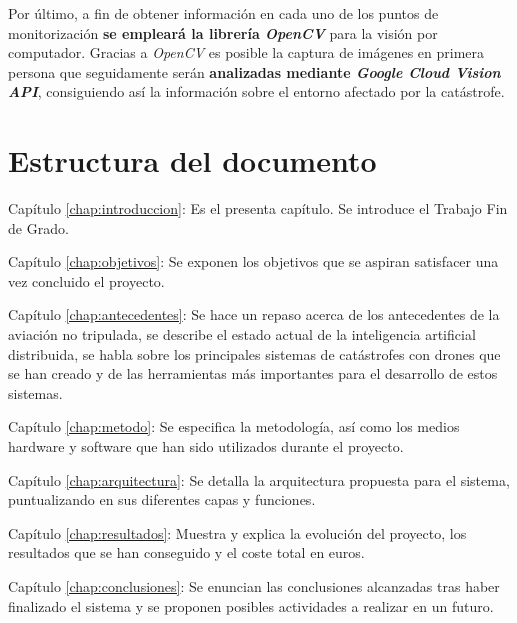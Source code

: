 Por último, a fin de obtener información en cada uno de los puntos de monitorización \textbf{se empleará la librería \textit{OpenCV}} para la visión por computador. Gracias a \textit{OpenCV} es posible la captura de imágenes en primera persona que seguidamente serán \textbf{analizadas mediante \textit{Google Cloud Vision \acs{API}}}, consiguiendo así la información sobre el entorno afectado por la catástrofe.

\section{Estructura del documento}

\begin{definitionlist}
\item[Capítulo \ref{chap:introduccion}: \nameref{chap:introduccion}] Es el presenta capítulo. Se introduce el Trabajo Fin de Grado.
\item[Capítulo \ref{chap:objetivos}: \nameref{chap:objetivos}] Se exponen los objetivos que se aspiran satisfacer una vez concluido el proyecto.
\item[Capítulo \ref{chap:antecedentes}: \nameref{chap:antecedentes}] Se hace un repaso acerca de los antecedentes de la aviación no tripulada, se describe el estado actual de la inteligencia artificial distribuida, se habla sobre los principales sistemas de catástrofes con drones que se han creado y de las herramientas más importantes para el desarrollo de estos sistemas.
\item[Capítulo \ref{chap:metodo}: \nameref{chap:metodo}] Se especifica la metodología, así como los medios hardware y software que han sido utilizados durante el proyecto.
\item[Capítulo \ref{chap:arquitectura}: \nameref{chap:arquitectura}] Se detalla la arquitectura propuesta para el sistema, puntualizando en sus diferentes capas y funciones.
\item[Capítulo \ref{chap:resultados}: \nameref{chap:resultados}] Muestra y explica la evolución del proyecto, los resultados que se han conseguido y el coste total en euros.
\item[Capítulo \ref{chap:conclusiones}: \nameref{chap:conclusiones}] Se enuncian las conclusiones alcanzadas tras haber finalizado el sistema y se proponen posibles actividades a realizar en un futuro.
\end{definitionlist}



